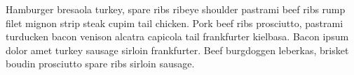 Hamburger bresaola turkey, spare ribs ribeye shoulder pastrami beef ribs rump filet mignon strip steak cupim tail chicken. Pork beef ribs prosciutto, pastrami turducken bacon venison alcatra capicola tail frankfurter kielbasa. Bacon ipsum dolor amet turkey sausage sirloin frankfurter. Beef burgdoggen leberkas, brisket boudin prosciutto spare ribs sirloin sausage. \ ~ 